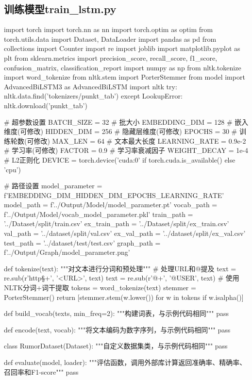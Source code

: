 \subsection{训练模型train\_lstm.py}
\begin{codeblock}[language=Python]
import torch
import torch.nn as nn
import torch.optim as optim
from torch.utils.data import Dataset, DataLoader
import pandas as pd
from collections import Counter
import re
import joblib
import matplotlib.pyplot as plt
from sklearn.metrics import precision_score, recall_score, f1_score, confusion_matrix, classification_report
import numpy as np
from nltk.tokenize import word_tokenize
from nltk.stem import PorterStemmer
from model import AdvancedBiLSTM3 as AdvancedBiLSTM
import nltk
try:
    nltk.data.find('tokenizers/punkt_tab')
except LookupError:
    nltk.download('punkt_tab')

# 超参数设置
BATCH_SIZE = 32         # 批大小
EMBEDDING_DIM = 128     # 嵌入维度(可修改)
HIDDEN_DIM = 256        # 隐藏层维度(可修改)
EPOCHS = 30             # 训练轮数(可修改)
MAX_LEN = 64            # 文本最大长度
LEARNING_RATE = 0.9e-2  # 学习率(可修改)
FACTOR = 0.9            # 学习率衰减因子
WEIGHT_DECAY = 1e-4     # L2正则化
DEVICE = torch.device('cuda:0' if torch.cuda.is_available() else 'cpu') 

# 路径设置
model_parameter = f'{EMBEDDING_DIM}_{HIDDEN_DIM}_{EPOCHS}_{LEARNING_RATE}'
model_path = f'../Output/Model/{model_parameter}.pt'
vocab_path = f'../Output/Model/vocab_{model_parameter}.pkl'
train_path = '../Dataset/split/train.csv'
ex_train_path = '../Dataset/split/ex_train.csv'
val_path = '../dataset/split/val.csv'
ex_val_path = '../dataset/split/ex_val.csv'
test_path = '../dataset/test/test.csv'
graph_path = f'../Output/Graph/{model_parameter}.png'

def tokenize(text):
    """对文本进行分词和预处理"""
    # 处理URL和@提及
    text = re.sub(r'http\S+', '<URL>', text)
    text = re.sub(r'@\w+', '@USER', text)
    # 使用NLTK分词+词干提取
    tokens = word_tokenize(text)
    stemmer = PorterStemmer()
    return [stemmer.stem(w.lower()) for w in tokens if w.isalpha()]

def build_vocab(texts, min_freq=2):
    """构建词表，与示例代码相同"""
    pass

def encode(text, vocab):
    """将文本编码为数字序列，与示例代码相同"""
    pass

class RumorDataset(Dataset):
    """自定义数据集类，与示例代码相同"""
    pass
    
def evaluate(model, loader):
    """评估函数，调用外部库计算返回准确率、精确率、召回率和F1-score"""
    pass


\end{codeblock}
